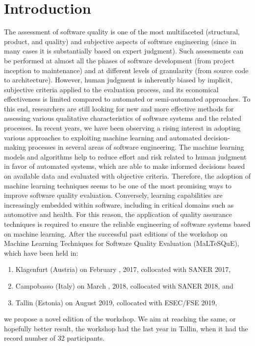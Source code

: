 
\section{Introduction}
\label{sec:motivation}

The assessment of software quality is one of the most multifaceted (\eg structural, product, and quality) and subjective aspects of software engineering (since in many cases it is substantially based on expert judgment).
Such assessments can be performed at almost all the phases of software development (from project inception to maintenance) and at different levels of granularity (from source code to architecture).
However, human judgment is inherently biased by implicit, subjective criteria applied to the evaluation process, and its economical effectiveness is limited compared to automated or semi-automated approaches.
To this end, researchers are still looking for new and more effective methods for assessing various qualitative characteristics of software systems and the related processes.
In recent years, we have been observing a rising interest in adopting various approaches to exploiting machine learning and automated decision-making processes in several areas of software engineering.
The machine learning models and algorithms help to reduce effort and risk related to human judgment in favor of automated systems, which are able to make informed decisions based on available data and evaluated with objective criteria.
Therefore, the adoption of machine learning techniques seems to be one of the most promising ways to improve software quality evaluation.
Conversely, learning capabilities are increasingly embedded within software, including in critical domains such as automotive and health.
For this reason, the application of quality assurance techniques is required to ensure the reliable engineering of software systems based on machine learning.
After the successful past editions of the workshop on Machine Learning Techniques for Software Quality Evaluation (MaLTeSQuE), which have been held in:
\begin{enumerate}
    \item Klagenfurt (Austria) on February , 2017, collocated with SANER 2017,
    \item Campobasso (Italy) on March  , 2018, collocated with SANER 2018, and
    \item Tallin (Estonia) on August  2019, collocated with ESEC/FSE 2019,
\end{enumerate}
we propose a novel edition of the workshop.
We aim at reaching the same, or hopefully better result, the workshop had the last year in Tallin, when it had the record number of 32 participants.

